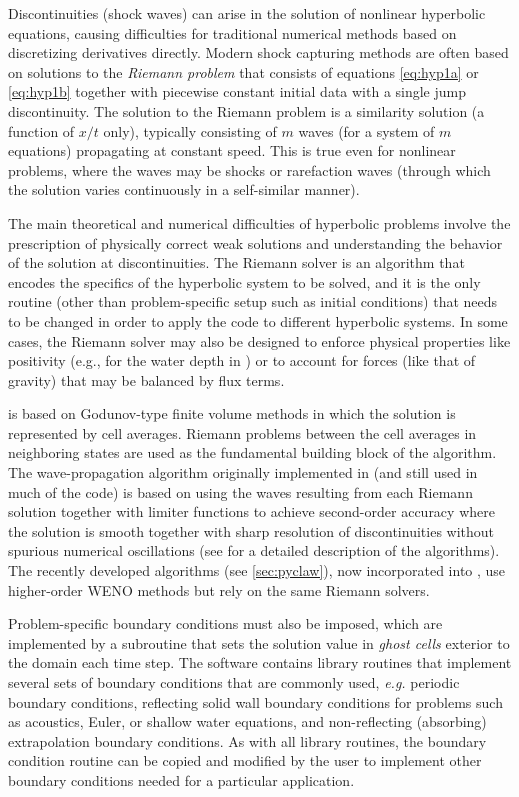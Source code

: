 Discontinuities (shock waves) can arise in the solution of nonlinear
hyperbolic equations, causing difficulties for traditional numerical
methods based on discretizing derivatives directly.  Modern shock
capturing methods are often based on solutions to the {\em Riemann
problem} that consists of equations \cref{eq:hyp1a} or
\cref{eq:hyp1b} together with piecewise constant initial data with a
single jump discontinuity.  The solution to the Riemann problem is a
similarity solution (a function of $x/t$ only), typically consisting
of $m$ waves (for a system of $m$ equations) propagating at constant
speed.  This is true even for nonlinear problems, where the waves may
be shocks or rarefaction waves (through which the
solution varies continuously in a self-similar manner).

The main theoretical and numerical difficulties of hyperbolic problems
involve the prescription of physically correct weak solutions and
understanding the behavior of the solution at discontinuities.  The
Riemann solver is an algorithm that encodes the specifics of the
hyperbolic system to be solved, and it is the only routine (other than
problem-specific setup such as initial conditions) 
that needs to be changed in order to apply the
code to different hyperbolic systems.  In some cases, the Riemann
solver may also be designed to enforce physical properties like
positivity (e.g., for the water depth in \geoclaw) or to account for
forces (like that of gravity) that may be balanced by flux terms.

\clawpack is based on Godunov-type finite volume methods in which
the solution is represented by cell averages.  Riemann problems
between the cell averages in neighboring states are used as the
fundamental building block of the algorithm.
The wave-propagation algorithm originally
implemented in \clawpack (and still used in much of the code) is based on
using the waves resulting from each Riemann solution together with limiter
functions to achieve second-order accuracy where the solution is smooth
together with sharp resolution of discontinuities without spurious numerical
oscillations (see \cite{rjl:fvmhp} for a detailed description of the
algorithms).   The recently developed \sharpclaw algorithms (see
\cref{sec:pyclaw}), now incorporated into \pyclaw, use higher-order WENO methods
but rely on the same Riemann solvers.

Problem-specific boundary conditions must also be imposed, which
are implemented by a subroutine that sets the solution value in
{\em ghost cells} exterior to the domain each time step.  The
\clawpack software contains library routines that implement several
sets of boundary conditions that are commonly used, {\em e.g.}
periodic boundary conditions, reflecting solid wall boundary
conditions for problems such as acoustics, Euler, or shallow water
equations, and non-reflecting (absorbing) extrapolation boundary
conditions.  As with all \clawpack library routines, the boundary
condition routine can be copied and modified by the user to implement
other boundary conditions needed for a particular application.


